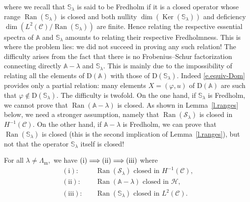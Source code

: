 \documentclass[AHL,Unicode,longabstracts]{cedram}
\DeclareMathOperator{\Ker}{Ker}
\DeclareMathOperator{\Ran}{Ran}
\newcommand{\calC}{\mathcal{C}}
\newcommand{\calH}{\mathcal{H}}
\newcommand{\calS}{\mathcal{S}}
\newcommand{\bbA}{\mathbb{A}}
\newcommand{\bbS}{\mathbb{S}}
\newcommand{\rmD}{{\mathrm{D}}}
\newcommand{\Lm}{{\Lambda_{\mathrm{m}}}}
\begin{document}
where we recall that $\bbS_\lambda$ is said to be Fredholm if it is a closed operator whose range $\Ran(\bbS_\lambda)$ is closed and both nullity $\dim(\Ker(\bbS_\lambda))$ and deficiency $\dim(L^2(\calC)/\Ran(\bbS_\lambda))$ are finite. Hence relating the respective essential spectra of $\bbA$ and $\bbS_\lambda$ amounts to relating their respective Fredholmness. This is where the problem lies: we did not succeed in proving any such relation! The difficulty arises from the fact that there is no Frobenius--Schur factorization connecting directly $\bbA - \lambda$ and $\bbS_\lambda.$ This is mainly due to the impossibility of relating all the elements of $\rmD(\bbA)$ with those of $\rmD(\bbS_\lambda)$. Indeed \eqref{e.equiv-Dom} provides only a partial relation: many elements $X = (\varphi,u)$ of $\rmD(\bbA)$ are such that $\varphi \notin \rmD(\bbS_\lambda).$ The difficulty is twofold. On the one hand, if $\bbS_\lambda$ is Fredholm, we cannot prove that $\Ran(\bbA - \lambda)$ is closed. As shown in Lemma~\ref{l.ranges} below, we need a stronger assumption, namely that $\Ran(\calS_\lambda)$ is closed in $H^{-1}(\calC).$ On the other hand, if $\bbA - \lambda$ is Fredholm, we can prove that $\Ran(\bbS_\lambda)$ is closed (this is the second implication of Lemma~\ref{l.ranges}), but not that the operator $\bbS_\lambda$ itself is closed!


\begin{lemm}
For all $\lambda \neq \Lm,$ we have ${\rm (i)} \Longrightarrow {\rm (ii)} \Longrightarrow {\rm (iii)}$ where
\begin{align*}
\mathrm{(i)}: & \quad \Ran(\calS_\lambda) \text{ closed in } H^{-1}(\calC), \\
\mathrm{(ii)}: & \quad \Ran(\bbA - \lambda) \text{ closed in } \calH, \\
\mathrm{(iii)}: & \quad \Ran(\bbS_\lambda) \text{ closed in } L^2(\calC).
\end{align*}\label{l.ranges}
\end{lemm}
\end{document}
